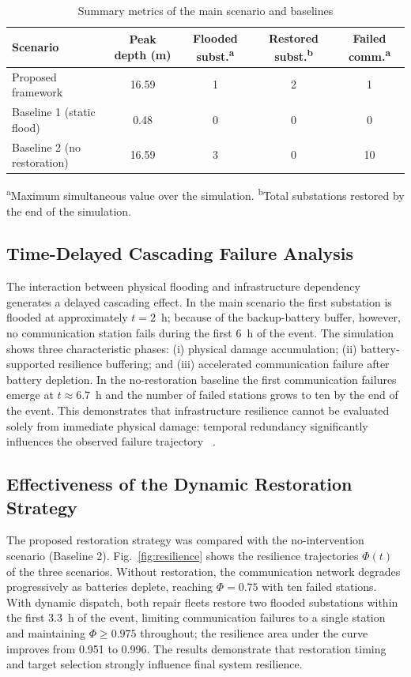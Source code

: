 \documentclass[preprint,12pt]{elsarticle}
\begin{document}
\begin{table}[H]
\centering
\caption{Summary metrics of the main scenario and baselines}
\label{tab:results}
\begin{tabular}{lcccc}
\toprule
Scenario & Peak depth (m) & Flooded subst.\textsuperscript{a} & Restored subst.\textsuperscript{b} & Failed comm.\textsuperscript{a} \\
\midrule
Proposed framework & 16.59 & 1 & 2 & 1 \\
Baseline 1 (static flood) & 0.48 & 0 & 0 & 0 \\
Baseline 2 (no restoration) & 16.59 & 3 & 0 & 10 \\
\bottomrule
\end{tabular}

\medskip
\footnotesize
\textsuperscript{a}Maximum simultaneous value over the simulation.
\textsuperscript{b}Total substations restored by the end of the simulation.
\end{table}

\subsection{Time-Delayed Cascading Failure Analysis}
The interaction between physical flooding and infrastructure dependency
generates a delayed cascading effect. In the main scenario the first
substation is flooded at approximately $t=2$~h; because of the backup-battery
buffer, however, no communication station fails during the first 6~h of the
event. The simulation shows three characteristic phases: (i) physical damage
accumulation; (ii) battery-supported resilience buffering; and (iii)
accelerated communication failure after battery depletion. In the
no-restoration baseline the first communication failures emerge at
$t\approx 6.7$~h and the number of failed stations grows to ten by the end of
the event. This demonstrates that infrastructure resilience cannot be
evaluated solely from immediate physical damage: temporal redundancy
significantly influences the observed failure trajectory
~\cite{ouyang2012time,panteli2015grid}.

\subsection{Effectiveness of the Dynamic Restoration Strategy}
The proposed restoration strategy was compared with the no-intervention
scenario (Baseline 2). Fig.~\ref{fig:resilience} shows the resilience
trajectories $\Phi(t)$ of the three scenarios. Without restoration, the
communication network degrades progressively as batteries deplete, reaching
$\Phi = 0.75$ with ten failed stations. With dynamic dispatch, both repair
fleets restore two flooded substations within the first 3.3~h of the event,
limiting communication failures to a single station and maintaining
$\Phi \ge 0.975$ throughout; the resilience area under the curve improves
from 0.951 to 0.996. The results demonstrate that restoration timing and
target selection strongly influence final system resilience.
\end{document}
